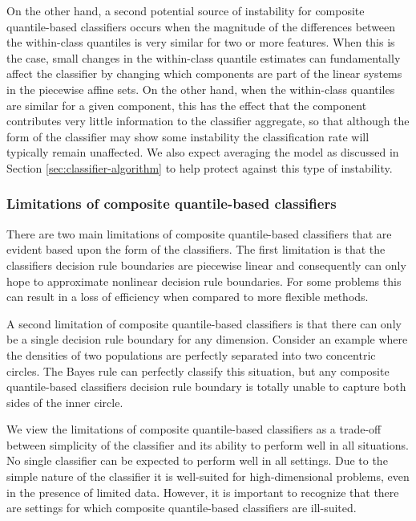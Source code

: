 On the other hand, a second potential source of instability for composite
quantile-based classifiers occurs when the magnitude of the differences between
the within-class quantiles is very similar for two or more features.  When this
is the case, small changes in the within-class quantile estimates can
fundamentally affect the classifier by changing which components are part of the
linear systems in the piecewise affine sets.  On the other hand, when the
within-class quantiles are similar for a given component, this has the effect
that the component contributes very little information to the classifier
aggregate, so that although the form of the classifier may show some instability
the classification rate will typically remain unaffected.  We also expect
averaging the model as discussed in Section \ref{sec:classifier-algorithm} to
help protect against this type of instability.


\subsubsection{Limitations of composite quantile-based classifiers}
\label{sec:limitations}

There are two main limitations of composite quantile-based classifiers that are
evident based upon the form of the classifiers.  The first limitation is that
the classifiers decision rule boundaries are piecewise linear and consequently
can only hope to approximate nonlinear decision rule boundaries.  For some
problems this can result in a loss of efficiency when compared to more flexible
methods.

A second limitation of composite quantile-based classifiers is that there can
only be a single decision rule boundary for any dimension.  Consider an example
where the densities of two populations are perfectly separated into two
concentric circles.  The Bayes rule can perfectly classify this situation, but
any composite quantile-based classifiers decision rule boundary is totally
unable to capture both sides of the inner circle.

We view the limitations of composite quantile-based classifiers as a trade-off
between simplicity of the classifier and its ability to perform well in all
situations.  No single classifier can be expected to perform well in all
settings.  Due to the simple nature of the classifier it is well-suited for
high-dimensional problems, even in the presence of limited data.  However, it is
important to recognize that there are settings for which composite
quantile-based classifiers are ill-suited.





